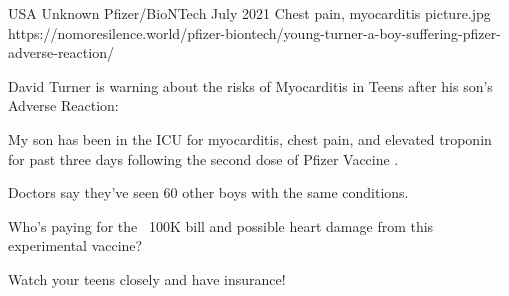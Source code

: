 {USA}
{Unknown}
{Pfizer/BioNTech}
{July 2021}
{Chest pain, myocarditis}
{picture.jpg}
{https://nomoresilence.world/pfizer-biontech/young-turner-a-boy-suffering-pfizer-adverse-reaction/}
{

David Turner is warning about the risks of Myocarditis in Teens after his son’s
Adverse Reaction:

My son has been in the ICU for myocarditis, chest pain, and elevated troponin
for past three days following the second dose of Pfizer Vaccine .

Doctors say they’ve seen 60 other boys with the same conditions.

Who’s paying for the ~100K bill and possible heart damage from this experimental
vaccine?

Watch your teens closely and have insurance!

}
